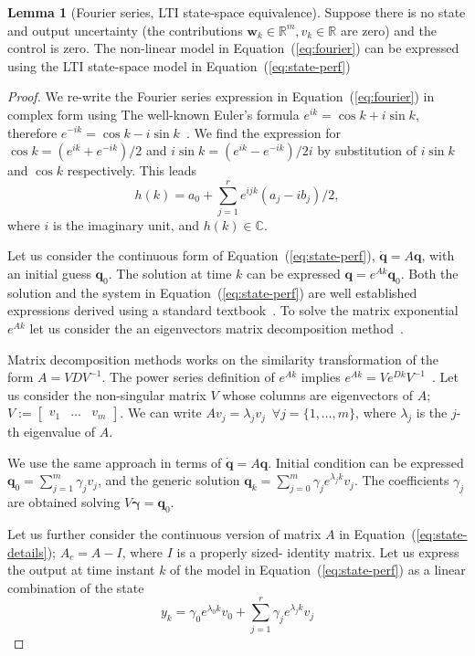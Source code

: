 \documentclass[letterpaper,10pt,conference]{ieeeconf}
\theoremstyle{definition}
\newtheorem{lem}[thm]{Lemma}
\begin{document}
\begin{lem}[Fourier series, LTI state-space equivalence]Suppose there is no state and output uncertainty (the contributions $\mathbf{w}_k\in\mathbb{R}^m,v_k\in\mathbb{R}$ are zero) and the control is zero. The non-linear model in Equation~(\ref{eq:fourier}) can be expressed using the LTI state-space model in Equation~(\ref{eq:state-perf})
\end{lem}
\begin{proof}
We re-write the Fourier series expression in Equation~(\ref{eq:fourier}) in complex form using  The well-known Euler's formula $e^{ik}=\cos{k}+i\sin{k}$, therefore $e^{-ik}=\cos{k}-i\sin{k}$~\cite{ogata2002modern}. We find the expression for $\cos{k}=(e^{ik}+e^{-ik})/2$ and $i\sin{k}=(e^{ik}-e^{-ik})/2i$ by substitution of $i\sin{k}$ and $\cos{k}$ respectively. This leads
  \begin{equation}
    h(k)=a_0+\sum_{j=1}^r{e^{ijk}(a_j-ib_j)/2},
  \end{equation}
where $i$ is the imaginary unit, and $h(k)\in\mathbb{C}$. 

Let us consider the continuous form of Equation~(\ref{eq:state-perf}), $\dot{\mathbf{q}}=A\mathbf{q}$, with an initial guess $\mathbf{q}_0$. The solution at time $k$ can be expressed $\mathbf{q}=e^{Ak}\mathbf{q}_0$. Both the solution and the system in Equation~(\ref{eq:state-perf}) are well established expressions derived using a standard textbook~\cite{kuo1967automatic}. To solve the matrix exponential $e^{Ak}$ let us consider the an eigenvectors matrix decomposition method~\cite{moler2003nineteen}.

Matrix decomposition methods works on the similarity transformation of the form $A=VDV^{-1}$. The power series definition of $e^{Ak}$ implies $e^{Ak}=Ve^{Dk}V^{-1}$~\cite{moler2003nineteen}. Let us consider the non-singular matrix $V$ whose columns are eigenvectors of $A$; $V:=\begin{bmatrix}v_1 & \dots & v_m\end{bmatrix}$. We can write $Av_j=\lambda_jv_j\,\,\,\forall j=\{1,\dots,m\}$, where $\lambda_j$ is the $j$-th eigenvalue of $A$. 

We use the same approach in terms of $\dot{\mathbf{q}}=A\mathbf{q}$. Initial condition can be expressed $\mathbf{q}_0=\sum_{j=1}^m{\gamma_jv_j}$, and the generic solution $\mathbf{q}_k=\sum_{j=0}^m{\gamma_je^{\lambda_jk}v_j}$. The coefficients $\gamma_j$ are obtained solving $V\mathbf{\gamma}=\mathbf{q}_0$.

Let us further consider the continuous version of matrix $A$ in Equation~(\ref{eq:state-details}); $A_c=A-I$, where $I$ is a properly sized- identity matrix. Let us express the output at time instant $k$ of the model in Equation~(\ref{eq:state-perf}) as a linear combination of the state
\begin{equation}
  y_k=\gamma_0e^{\lambda_0k}v_0+\sum_{j=1}^r{\gamma_je^{\lambda_jk}v_j}
\end{equation}


\end{proof}
\end{document}
